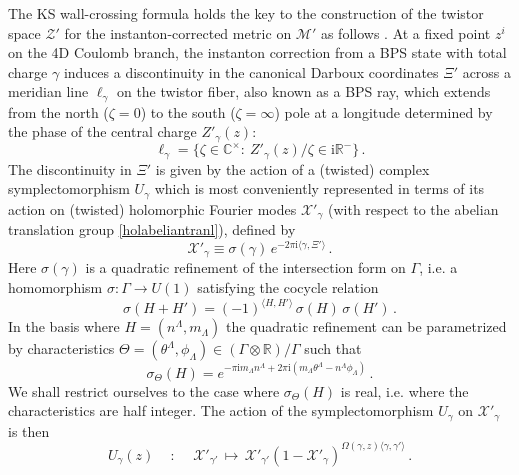 \documentclass[12pt,reqno]{article}
\numberwithin{equation}{section}
\newcommand{\be}{\begin{equation}}
\newcommand{\ee}{\end{equation}}
\newcommand{\I}{\mathrm{i}}
\newcommand{\cM}{\mathcal{M}}
\newcommand{\cX}{\mathcal{X}}
\newcommand{\cZ}{\mathcal{Z}}
\newcommand{\IR}{\mathbb{R}}
\newcommand{\stg}{{U}_\gamma}
\def\varpihk{\zeta}
\def\pcM{\cM'}
\def\pcZ{\cZ'}
\def\pXi{\Xi'}
\def\pcX{\cX'}
\numberwithin{equation}{section}
\begin{document}
 The KS wall-crossing formula holds the key to the construction of the twistor space $\pcZ$ for
 the instanton-corrected metric on $\pcM$ as follows \cite{ks,Gaiotto:2008cd}. At a fixed
 point $z^i$ on the 4D Coulomb branch, the instanton correction from a BPS state
 with total charge $\gamma$ induces a discontinuity in the canonical
 Darboux coordinates $\pXi$
 across a meridian line $\ell_\gamma$ on the twistor fiber, also known as
 a BPS ray, which extends from the north ($\varpihk=0$) to the south ($\varpihk=\infty$) pole at a
 longitude determined by the phase of the central charge $Z'_\gamma(z)$:
\be
\ell_\gamma=\{ \varpihk \in \mathbb{C}^{\times}:\  Z'_\gamma(z)/\varpihk \in \I\IR^-\}\, .
\label{lgam}
\ee
The discontinuity in $\pXi$ is given by the action of a (twisted) complex symplectomorphism $\stg$
which is most  conveniently represented in terms of its action on (twisted) holomorphic
Fourier modes $\pcX_\gamma$ (with respect to the abelian translation group
\eqref{holabeliantranl}), defined by
\be
\label{defpcXg}
\pcX_\gamma\equiv \sigma(\gamma)\, e^{-2\pi\I \langle \gamma,\pXi\rangle}\, .
\ee
Here $\sigma(\gamma)$
is a quadratic refinement
of the intersection form on $\Gamma$, i.e. a homomorphism
$\sigma: \Gamma\to U(1)$ satisfying the cocycle relation
\be
\label{qrifprop}
\sigma(H+H') = (-1)^{\langle H, H' \rangle}\, \sigma(H)\, \sigma(H') \, .
\ee
In the basis where $H=(n^{\Lambda}, m_\Lambda)$
the quadratic refinement can be parametrized by characteristics
$\Theta=(\theta^\Lambda,\phi_\Lambda)\in(\Gamma\otimes \IR)/\Gamma$
such that \cite{Belov:2006jd}
\be
\sigma_\Theta(H) = e^{-\pi \I  m_\Lambda n^\Lambda + 2\pi \I\left(m_\Lambda \theta^\Lambda
- n^\Lambda \phi_\Lambda\right)}\, .
\label{quadraticrefinement}
\ee
We shall restrict ourselves to the case where $\sigma_\Theta(H)$ is real, i.e. where
the characteristics are half integer.
The action of the symplectomorphism $\stg$ on $\pcX_\gamma$ is then
\be
\label{ugamma}
\stg(z)\, \quad :\, \quad  \pcX_{\gamma'}\, \longmapsto\,
\pcX_{\gamma'} (1- \pcX_\gamma)^{\Omega(\gamma,z) \langle \gamma, \gamma' \rangle}\, .
\ee
\end{document}
